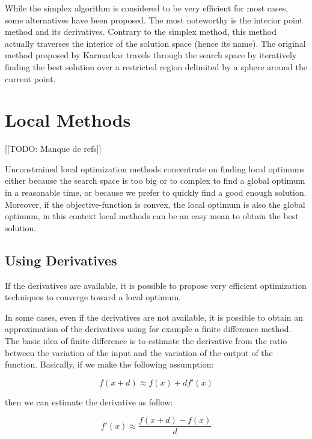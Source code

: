 While the simplex algorithm is considered to be very efficient for most cases, some alternatives have been proposed. The most noteworthy is the interior point method and its derivatives. Contrary to the simplex method, this method actually traverses the interior of the solution space (hence its name). The original method proposed by Karmarkar \cite{Karmarkar:1984:NPA:800057.808695} travels through the search space by iteratively finding the best solution over a restricted region delimited by a sphere around the current point.

\section{Local Methods}

[[TODO: Manque de refs]]

Unconstrained local optimization methods concentrate on finding local optimums either because the search space is too big or to complex to find a global optimum in a reasonable time, or because we prefer to quickly find a good enough solution.
 Moreover, if the objective-function is convex, the local optimum is also the global optimum, in this context local methods can be an easy mean to obtain the best solution.

\subsection{Using Derivatives}

If the derivatives are available, it is possible to propose very efficient optimization techniques to converge toward a local optimum.

In some cases, even if the derivatives are not available, it is possible to obtain an approximation of the derivatives using for example a finite difference method. The basic idea of finite difference is to estimate the derivative from the ratio between the variation of the input and the variation of the output of the function.
Basically, if we make the following assumption:

\begin{equation*}f(x + d) \approx f(x) +df'(x)\end{equation*}

then we can estimate the derivative as follow:

\begin{equation*}f'(x) \approx \frac{f(x + d)  - f(x)}{d}\end{equation*}

